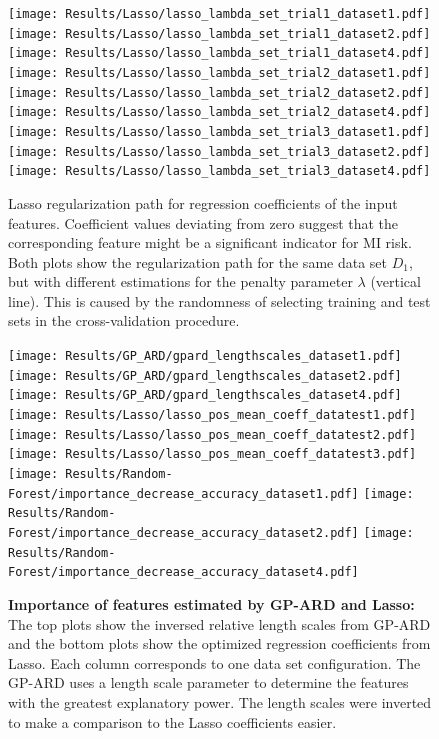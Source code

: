 \documentclass{article}
\begin{document}
\begin{figure}
  \texttt{[image: Results/Lasso/lasso\_lambda\_set\_trial1\_dataset1.pdf]}
  \texttt{[image: Results/Lasso/lasso\_lambda\_set\_trial1\_dataset2.pdf]}
  \texttt{[image: Results/Lasso/lasso\_lambda\_set\_trial1\_dataset4.pdf]} \\
  \texttt{[image: Results/Lasso/lasso\_lambda\_set\_trial2\_dataset1.pdf]}
  \texttt{[image: Results/Lasso/lasso\_lambda\_set\_trial2\_dataset2.pdf]}
  \texttt{[image: Results/Lasso/lasso\_lambda\_set\_trial2\_dataset4.pdf]} \\
  \texttt{[image: Results/Lasso/lasso\_lambda\_set\_trial3\_dataset1.pdf]}
  \texttt{[image: Results/Lasso/lasso\_lambda\_set\_trial3\_dataset2.pdf]}
  \texttt{[image: Results/Lasso/lasso\_lambda\_set\_trial3\_dataset4.pdf]}   
\caption{\label{fig:lassopath}Lasso regularization path for regression coefficients of the input features. Coefficient values deviating from zero suggest that the corresponding feature might be a significant indicator for MI risk. Both plots show the regularization path for the same data set $D_1$, but with different estimations for the penalty parameter $\lambda$ (vertical line). This is caused by the randomness of selecting training and test sets in the cross-validation procedure.}
\end{figure}


\begin{figure}
  \texttt{[image: Results/GP\_ARD/gpard\_lengthscales\_dataset1.pdf]}
  \texttt{[image: Results/GP\_ARD/gpard\_lengthscales\_dataset2.pdf]}
  \texttt{[image: Results/GP\_ARD/gpard\_lengthscales\_dataset4.pdf]} \\
  \texttt{[image: Results/Lasso/lasso\_pos\_mean\_coeff\_datatest1.pdf]}
  \texttt{[image: Results/Lasso/lasso\_pos\_mean\_coeff\_datatest2.pdf]}
  \texttt{[image: Results/Lasso/lasso\_pos\_mean\_coeff\_datatest3.pdf]} \\
  \texttt{[image: Results/Random-Forest/importance\_decrease\_accuracy\_dataset1.pdf]}
  \texttt{[image: Results/Random-Forest/importance\_decrease\_accuracy\_dataset2.pdf]}
  \texttt{[image: Results/Random-Forest/importance\_decrease\_accuracy\_dataset4.pdf]}
  \caption{\label{fig:featureselect}\textbf{Importance of features estimated by GP-ARD and Lasso:} The top plots show the inversed relative length scales from GP-ARD and the bottom plots show the optimized regression coefficients from Lasso. Each column corresponds to one data set configuration. The GP-ARD uses a length scale parameter to determine the features with the greatest explanatory power. The length scales were inverted to make a comparison to the Lasso coefficients easier.
}
\end{figure}
\end{document}
